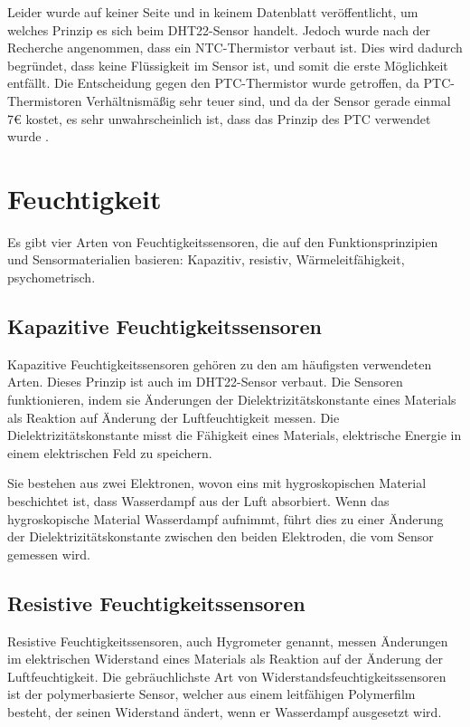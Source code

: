Leider wurde auf keiner Seite und in keinem Datenblatt veröffentlicht, um welches Prinzip es sich beim DHT22-Sensor handelt. Jedoch wurde nach der Recherche angenommen, dass ein NTC-Thermistor verbaut ist.  Dies wird dadurch begründet, dass keine Flüssigkeit im Sensor ist, und somit die erste Möglichkeit entfällt. Die Entscheidung gegen den PTC-Thermistor wurde getroffen, da PTC-Thermistoren Verhältnismäßig sehr teuer sind, und da der Sensor gerade einmal 7€ kostet, es sehr unwahrscheinlich ist, dass das Prinzip des PTC verwendet wurde \cite{Ametherm:2024}.

\section{Feuchtigkeit}

Es gibt vier Arten von Feuchtigkeitssensoren, die auf den Funktionsprinzipien und Sensormaterialien basieren: Kapazitiv, resistiv, Wärmeleitfähigkeit, psychometrisch. 

\subsection{Kapazitive Feuchtigkeitssensoren}

Kapazitive Feuchtigkeitssensoren gehören zu den am häufigsten verwendeten Arten. Dieses Prinzip ist auch im DHT22-Sensor verbaut. Die Sensoren funktionieren, indem sie Änderungen der Dielektrizitätskonstante eines Materials als Reaktion auf Änderung der Luftfeuchtigkeit messen. Die Dielektrizitätskonstante  misst die Fähigkeit eines Materials, elektrische Energie in einem elektrischen Feld zu speichern. 

Sie bestehen aus zwei Elektronen, wovon eins mit hygroskopischen Material beschichtet ist, dass Wasserdampf aus der Luft absorbiert. Wenn das hygroskopische Material Wasserdampf aufnimmt, führt dies zu einer Änderung der Dielektrizitätskonstante zwischen den beiden Elektroden, die vom Sensor gemessen wird. 

\subsection{Resistive Feuchtigkeitssensoren}

Resistive Feuchtigkeitssensoren, auch Hygrometer genannt, messen Änderungen im elektrischen Widerstand eines Materials als Reaktion auf der Änderung der Luftfeuchtigkeit. Die gebräuchlichste Art von Widerstandsfeuchtigkeitssensoren ist der polymerbasierte Sensor, welcher aus einem leitfähigen Polymerfilm besteht, der seinen Widerstand ändert, wenn er Wasserdampf ausgesetzt wird. 

